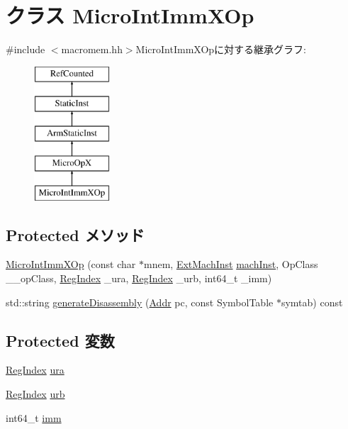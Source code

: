\hypertarget{classArmISA_1_1MicroIntImmXOp}{
\section{クラス MicroIntImmXOp}
\label{classArmISA_1_1MicroIntImmXOp}
}


{\ttfamily \#include $<$macromem.hh$>$}MicroIntImmXOpに対する継承グラフ:\begin{figure}[H]
\begin{center}
\leavevmode
\includegraphics[height=5cm]{classArmISA_1_1MicroIntImmXOp}
\end{center}
\end{figure}
\subsection*{Protected メソッド}
\begin{DoxyCompactItemize}
\item 
\hyperlink{classArmISA_1_1MicroIntImmXOp_aaf906f3827f63cd0b3ffdbcee54e9dfd}{MicroIntImmXOp} (const char $\ast$mnem, \hyperlink{classStaticInst_a5605d4fc727eae9e595325c90c0ec108}{ExtMachInst} \hyperlink{classStaticInst_a744598b194ca3d4201d9414ce4cc4af4}{machInst}, OpClass \_\-\_\-opClass, \hyperlink{classStaticInst_a36d25e03e43fa3bb4c5482cbefe5e0fb}{RegIndex} \_\-ura, \hyperlink{classStaticInst_a36d25e03e43fa3bb4c5482cbefe5e0fb}{RegIndex} \_\-urb, int64\_\-t \_\-imm)
\item 
std::string \hyperlink{classArmISA_1_1MicroIntImmXOp_a95d323a22a5f07e14d6b4c9385a91896}{generateDisassembly} (\hyperlink{classm5_1_1params_1_1Addr}{Addr} pc, const SymbolTable $\ast$symtab) const 
\end{DoxyCompactItemize}
\subsection*{Protected 変数}
\begin{DoxyCompactItemize}
\item 
\hyperlink{classStaticInst_a36d25e03e43fa3bb4c5482cbefe5e0fb}{RegIndex} \hyperlink{classArmISA_1_1MicroIntImmXOp_a8e6cd3e234a4950e7a1a05f1b24cfee0}{ura}
\item 
\hyperlink{classStaticInst_a36d25e03e43fa3bb4c5482cbefe5e0fb}{RegIndex} \hyperlink{classArmISA_1_1MicroIntImmXOp_a3771d4e6da84a09dbf436d6b1af2be46}{urb}
\item 
int64\_\-t \hyperlink{classArmISA_1_1MicroIntImmXOp_a11b34c3ceec32cc1f14d0ca9c099c470}{imm}
\end{DoxyCompactItemize}


